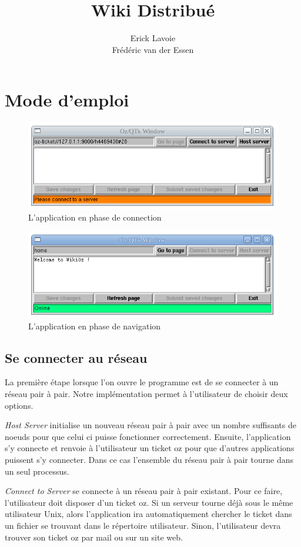 \documentclass{article}
\title{ Wiki Distribué }
\author{ Erick Lavoie \\ Frédéric van der Essen}
\begin{document}
	\maketitle
	\section{Mode d'emploi} 
	\begin{figure}[h]
		\centering
		\includegraphics[scale=0.5]{connection.png}
		\caption{L'application en phase de connection}
	\end{figure}
	\begin{figure}[h]
		\centering
		\includegraphics[scale=0.5]{connected.png}
		\caption{L'application en phase de navigation}
	\end{figure}
	
	\subsection{Se connecter au réseau}
	La première étape lorsque l'on ouvre le programme est de se connecter
	à un réseau pair à pair. Notre implémentation permet à l'utilisateur de
	choisir deux options. 
	
	\emph{Host Server} initialise un nouveau réseau
	pair à pair avec un nombre suffisants de noeuds pour que celui ci puisse
	fonctionner correctement. Ensuite, l'application s'y connecte et renvoie
	à l'utilisateur un ticket oz pour que d'autres applications puissent s'y
	connecter. Dans ce cas l'ensemble du réseau pair à pair tourne dans
	un seul processus.
	
	\emph{Connect to Server} se connecte à un réseau pair à pair existant.
	Pour ce faire, l'utilisateur doit disposer d'un ticket oz. Si un serveur
	tourne déjà sous le même utilisateur Unix, alors l'application ira
	automatiquement chercher le ticket dans un fichier se trouvant dans
	le répertoire utilisateur. Sinon, l'utilisateur devra trouver son ticket
	oz par mail ou sur un site web. 
	
\end{document}
